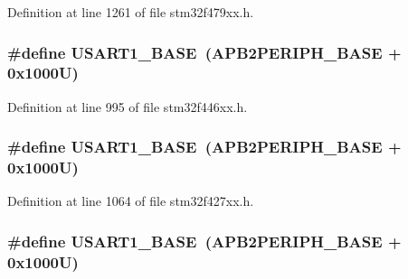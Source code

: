 Definition at line 1261 of file stm32f479xx.\+h.

\subsubsection[{\texorpdfstring{U\+S\+A\+R\+T1\+\_\+\+B\+A\+SE}{USART1_BASE}}]{\setlength{\rightskip}{0pt plus 5cm}\#define U\+S\+A\+R\+T1\+\_\+\+B\+A\+SE~({\bf A\+P\+B2\+P\+E\+R\+I\+P\+H\+\_\+\+B\+A\+SE} + 0x1000\+U)}\hypertarget{group___peripheral__memory__map_ga86162ab3f740db9026c1320d46938b4d}{}\label{group___peripheral__memory__map_ga86162ab3f740db9026c1320d46938b4d}


Definition at line 995 of file stm32f446xx.\+h.

\subsubsection[{\texorpdfstring{U\+S\+A\+R\+T1\+\_\+\+B\+A\+SE}{USART1_BASE}}]{\setlength{\rightskip}{0pt plus 5cm}\#define U\+S\+A\+R\+T1\+\_\+\+B\+A\+SE~({\bf A\+P\+B2\+P\+E\+R\+I\+P\+H\+\_\+\+B\+A\+SE} + 0x1000\+U)}\hypertarget{group___peripheral__memory__map_ga86162ab3f740db9026c1320d46938b4d}{}\label{group___peripheral__memory__map_ga86162ab3f740db9026c1320d46938b4d}


Definition at line 1064 of file stm32f427xx.\+h.

\subsubsection[{\texorpdfstring{U\+S\+A\+R\+T1\+\_\+\+B\+A\+SE}{USART1_BASE}}]{\setlength{\rightskip}{0pt plus 5cm}\#define U\+S\+A\+R\+T1\+\_\+\+B\+A\+SE~({\bf A\+P\+B2\+P\+E\+R\+I\+P\+H\+\_\+\+B\+A\+SE} + 0x1000\+U)}\hypertarget{group___peripheral__memory__map_ga86162ab3f740db9026c1320d46938b4d}{}\label{group___peripheral__memory__map_ga86162ab3f740db9026c1320d46938b4d}


